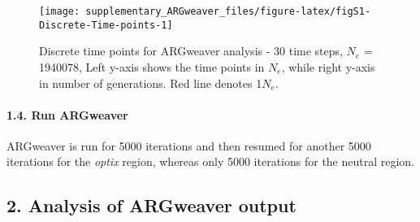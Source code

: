 \documentclass[
]{article}
\newenvironment{Shaded}{\begin{snugshade}}{\end{snugshade}}
\newcommand{\AttributeTok}[1]{\textcolor[rgb]{0.77,0.63,0.00}{#1}}
\newcommand{\CommentTok}[1]{\textcolor[rgb]{0.56,0.35,0.01}{\textit{#1}}}
\newcommand{\DataTypeTok}[1]{\textcolor[rgb]{0.13,0.29,0.53}{#1}}
\newcommand{\DecValTok}[1]{\textcolor[rgb]{0.00,0.00,0.81}{#1}}
\newcommand{\ExtensionTok}[1]{#1}
\newcommand{\NormalTok}[1]{#1}
\newcommand{\OperatorTok}[1]{\textcolor[rgb]{0.81,0.36,0.00}{\textbf{#1}}}
\newcommand{\VariableTok}[1]{\textcolor[rgb]{0.00,0.00,0.00}{#1}}
\begin{document}
\begin{figure}

{\centering \texttt{[image: supplementary\_ARGweaver\_files/figure-latex/figS1-Discrete-Time-points-1]} 

}

\caption{Discrete time points for ARGweaver analysis - 30 time steps, $N_e$ = 1940078, Left y-axis shows the time points in $N_e$, while right y-axis in number of generations. Red line denotes 1$N_e$.}\label{fig:figS1-Discrete-Time-points}
\end{figure}

\hypertarget{run-argweaver}{%
\paragraph{\texorpdfstring{1.4. Run ARGweaver\\
}{1.4. Run ARGweaver }}\label{run-argweaver}}

\hfill\break
ARGweaver is run for 5000 iterations and then resumed for another 5000
iterations for the \emph{optix} region, whereas only 5000 iterations for
the neutral region.\\

\begin{Shaded}
\end{Shaded}

\hfill\break

\hypertarget{analysis-of-argweaver-output}{%
\subsection{\texorpdfstring{2. Analysis of ARGweaver output\\
}{2. Analysis of ARGweaver output }}\label{analysis-of-argweaver-output}}
\end{document}
